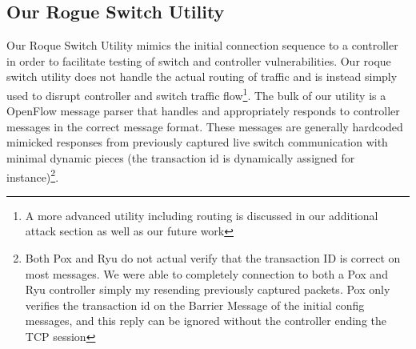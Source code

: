 \subsection{Our Rogue Switch Utility}
Our Roque Switch Utility mimics the initial connection sequence to a controller in order to facilitate testing of switch and controller vulnerabilities. Our roque switch utility does not handle the actual routing of traffic and is instead simply used to disrupt controller and switch traffic flow\footnote{A more advanced utility including routing is discussed in our additional attack section as well as our future work}. The bulk of our utility is a OpenFlow message parser that handles and appropriately responds to controller messages in the correct message format. These messages are generally hardcoded mimicked responses from previously captured live switch communication with minimal dynamic pieces (the transaction id is dynamically assigned for instance)\footnote{Both Pox and Ryu do not actual verify that the transaction ID is correct on most messages. We were able to completely connection to both a Pox and Ryu controller simply my resending previously captured packets. Pox only verifies the transaction id on the Barrier Message of the initial config messages, and this reply can be ignored without the controller ending the TCP session}. 
